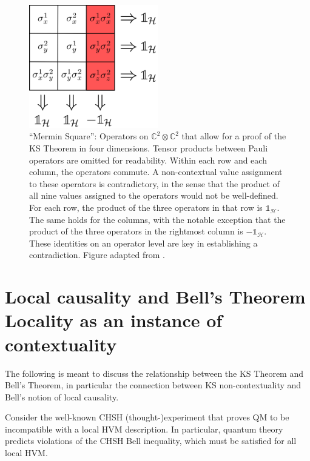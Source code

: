\begin{figure}
    \centering
    \includegraphics[width=0.5\textwidth]{images/4dim.png}
    \caption{``Mermin Square'': Operators on $\mathbb{C}^{2}\otimes\mathbb{C}^{2}$ that allow for a proof of the KS Theorem in four dimensions. Tensor products between Pauli operators are omitted for readability. Within each row and each column, the operators commute. A non-contextual value assignment to these operators is contradictory, in the sense that the product of all nine values assigned to the operators would not be well-defined. For each row, the product of the three operators in that row is $\mathbb{1}_\mathcal{H}$. The same holds for the columns, with the notable exception that the product of the three operators in the rightmost column is $-\mathbb{1}_\mathcal{H}$. These identities on an operator level are key in establishing a contradiction. Figure adapted from \cite{Mermin1993}.}
    \label{fig:4dim}
\end{figure}

\section[Local causality and Bell's Theorem\\ Locality as an instance of KS]{Local causality and Bell's Theorem\\ \large{Locality as an instance of contextuality}}

\label{sec:bell}
The following is meant to discuss the relationship between the KS Theorem and Bell's Theorem, in particular the connection between KS non-contextuality and Bell's notion of local causality. 

Consider the well-known CHSH (thought-)experiment \cite{Clauser1969,Colbeck2019,Spekkens2012} that proves QM to be incompatible with a local HVM description. In particular, quantum theory predicts violations of the CHSH Bell inequality, which must be satisfied for all local HVM.

